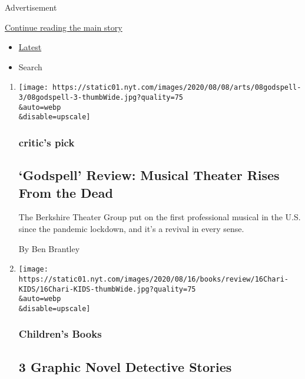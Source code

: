 Advertisement

\protect\hyperlink{after-mid1}{Continue reading the main story}

\begin{itemize}
\tightlist
\item
  \protect\hyperlink{stream-panel}{Latest}
\item
  Search
\end{itemize}

\begin{enumerate}
\def\labelenumi{\arabic{enumi}.}
\item
  \href{/2020/08/08/theater/godspell-review-berkshires.html}{}

  \texttt{[image: https://static01.nyt.com/images/2020/08/08/arts/08godspell-3/08godspell-3-thumbWide.jpg?quality=75\\\&auto=webp\\\&disable=upscale]}

  \hypertarget{critics-pick}{%
  \subsubsection{critic's pick}\label{critics-pick}}

  \hypertarget{godspell-review-musical-theater-rises-from-the-dead}{%
  \subsection{`Godspell' Review: Musical Theater Rises From the
  Dead}\label{godspell-review-musical-theater-rises-from-the-dead}}

  The Berkshire Theater Group put on the first professional musical in
  the U.S. since the pandemic lockdown, and it's a revival in every
  sense.

  By Ben Brantley
\item
  \href{/2020/08/08/books/review/drew-dernavich-elvin-link-please-report-to-the-principals-office.html}{}

  \texttt{[image: https://static01.nyt.com/images/2020/08/16/books/review/16Chari-KIDS/16Chari-KIDS-thumbWide.jpg?quality=75\\\&auto=webp\\\&disable=upscale]}

  \hypertarget{childrens-books}{%
  \subsubsection{Children's Books}\label{childrens-books}}

  \hypertarget{3-graphic-novel-detective-stories}{%
  \subsection{3 Graphic Novel Detective
  Stories}\label{3-graphic-novel-detective-stories}}


\end{enumerate}
